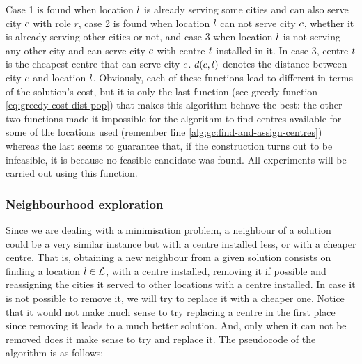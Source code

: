 Case 1 is found when location $l$ is already serving some cities and can also serve city
$c$ with role $r$, case 2 is found when location $l$ can not serve city $c$,
whether it is already serving other cities or not, and case 3 when location $l$ is not
serving any other city and can serve city $c$ with centre $t$ installed in it.
In case 3, centre $t$ is the cheapest centre that can serve city $c$.
$d(c, l)$ denotes the distance between city $c$ and location $l$.
Obviously, each of these functions lead to different in terms of the solution's cost, but it
is only the last function (see greedy function \ref{eq:greedy-cost-dist-pop}) that makes this
algorithm behave the best: the other two functions made it impossible for the algorithm to
find centres available for some of the locations used (remember line
\ref{alg:gc:find-and-assign-centres}) whereas the last seems to guarantee that,
if the construction turns out to be infeasible, it is because no feasible candidate was
found. All experiments will be carried out using this function.

\subsubsection{Neighbourhood exploration}
\label{sec:metaheuristics:greedy-algorithms:neighbourhood-exploration}

Since we are dealing with a minimisation problem, a neighbour of a solution could be a very
similar instance but with a centre installed less, or with a cheaper centre. That is,
obtaining a new neighbour from a given solution consists on finding a location $l \in
\mathcal{L}$, with a centre installed, removing it if possible and reassigning the cities it served
to other locations with a centre installed. In case it is not possible to remove it, we will
try to replace it with a cheaper one. Notice that it would not make much sense to try
replacing a centre in the first place since removing it leads to a much better solution. And,
only when it can not be removed does it make sense to try and replace it. The pseudocode of
the algorithm is as follows:

\hfill

